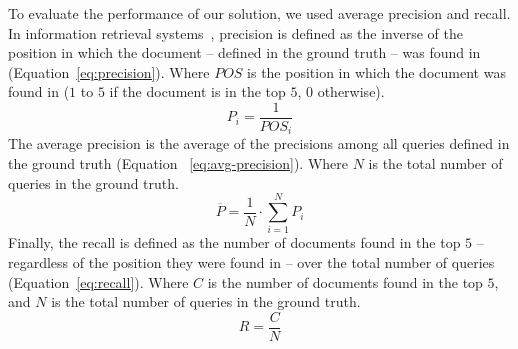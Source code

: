 To evaluate the performance of our solution, we used average precision and recall.
In information retrieval systems~\cite{frakes_information_1992}, precision is defined as the inverse of the position in which the document -- defined in the ground truth -- was found in (Equation~\ref{eq:precision}).
Where $POS$ is the position in which the document was found in ($1$ to $5$ if the document is in the top $5$, $0$ otherwise).
\begin{equation}
    P_i = \frac{1}{POS_i}
    \label{eq:precision}
\end{equation}
The average precision is the average of the precisions among all queries defined in the ground truth (Equation ~\ref{eq:avg-precision}).
Where $N$ is the total number of queries in the ground truth.
\begin{equation}
    \overline{P} = \frac{1}{N} \cdot \sum^N_{i=1}P_i
    \label{eq:avg-precision}
\end{equation}
Finally, the recall is defined as the number of documents found in the top $5$ -- regardless of the position they were found in -- over the total number of queries (Equation~\ref{eq:recall}).
Where $C$ is the number of documents found in the top $5$, and $N$ is the total number of queries in the ground truth.
\begin{equation}
    R = \frac{C}{N}
    \label{eq:recall}
\end{equation}
